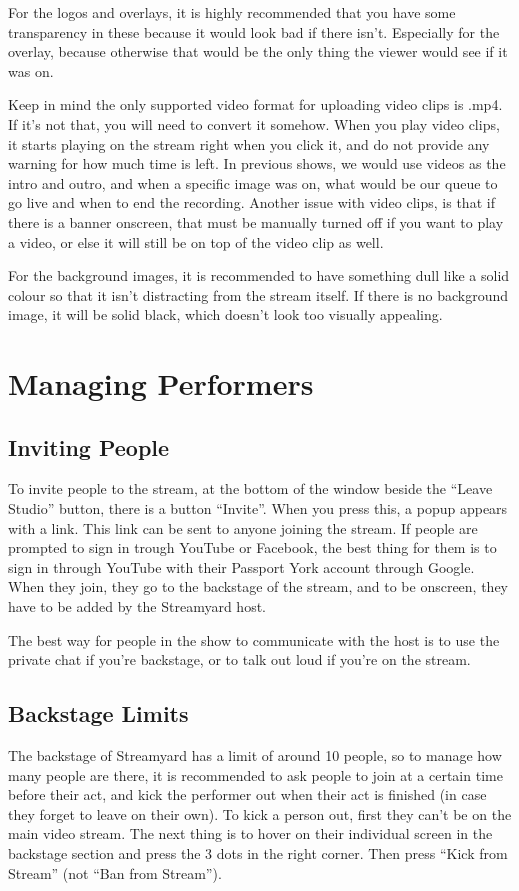\documentclass{article}
\begin{document}
For the logos and overlays, it is highly recommended that you have some transparency in these because it would look bad if there isn’t. Especially for the overlay, because otherwise that would be the only thing the viewer would see if it was on. 

Keep in mind the only supported video format for uploading video clips is .mp4. If it's not that, you will need to convert it somehow. When you play video clips, it starts playing on the stream right when you click it, and do not provide any warning for how much time is left. In previous shows, we would use videos as the intro and outro, and when a specific image was on, what would be our queue to go live and when to end the recording. Another issue with video clips, is that if there is a banner onscreen, that must be manually turned off if you want to play a video, or else it will still be on top of the video clip as well.

For the background images, it is recommended to have something dull like a solid colour so that it isn’t distracting from the stream itself. If there is no background image, it will be solid black, which doesn’t look too visually appealing.

\section{Managing Performers}
\subsection{Inviting People}
To invite people to the stream, at the bottom of the window beside the “Leave Studio” button, there is a button “Invite”. When you press this, a popup appears with a link. This link can be sent to anyone joining the stream. If people are prompted to sign in trough YouTube or Facebook, the best thing for them is to sign in through YouTube with their Passport York account through Google. When they join, they go to the backstage of the stream, and to be onscreen, they have to be added by the Streamyard host.

The best way for people in the show to communicate with the host is to use the private chat if you’re backstage, or to talk out loud if you’re on the stream.

\subsection{Backstage Limits}\label{sec:Limits}
The backstage of Streamyard has a limit of around 10 people, so to manage how many people are there, it is recommended to ask people to join at a certain time before their act, and kick the performer out when their act is finished (in case they forget to leave on their own). To kick a person out, first they can’t be on the main video stream. The next thing is to hover on their individual screen in the backstage section and press the 3 dots in the right corner. Then press “Kick from Stream” (not “Ban from Stream”). 
\end{document}
